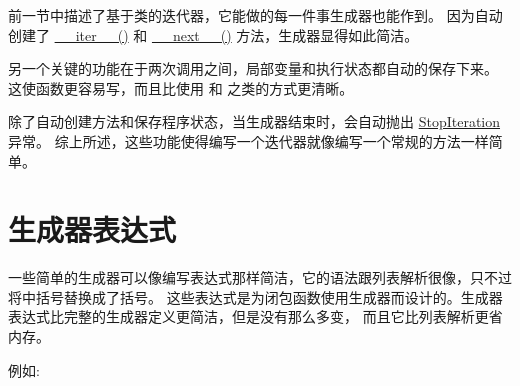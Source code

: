 \documentclass[a4paper,10pt,english]{sphinxmanual}
\begin{document}
前一节中描述了基于类的迭代器，它能做的每一件事生成器也能作到。
因为自动创建了 \href{https://docs.python.org/3/reference/datamodel.html\#object.\_\_iter\_\_}{\_\_iter\_\_()}
和 \href{https://docs.python.org/3/reference/expressions.html\#generator.\_\_next\_\_}{\_\_next\_\_()} 方法，生成器显得如此简洁。

另一个关键的功能在于两次调用之间，局部变量和执行状态都自动的保存下来。
这使函数更容易写，而且比使用  和  之类的方式更清晰。

除了自动创建方法和保存程序状态，当生成器结束时，会自动抛出 \href{https://docs.python.org/3/library/exceptions.html\#StopIteration}{StopIteration}  异常。
综上所述，这些功能使得编写一个迭代器就像编写一个常规的方法一样简单。


\section{生成器表达式}
\label{classes:tut-genexps}\label{classes:id26}
一些简单的生成器可以像编写表达式那样简洁，它的语法跟列表解析很像，只不过将中括号替换成了括号。
这些表达式是为闭包函数使用生成器而设计的。生成器表达式比完整的生成器定义更简洁，但是没有那么多变，
而且它比列表解析更省内存。

例如:
\end{document}
